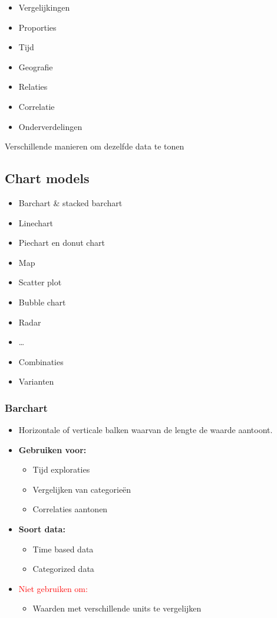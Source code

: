 \documentclass{article}
\newcommand{\bold}[1]{\textbf{#1}}
\begin{document}
\begin{itemize}
    \item Vergelijkingen
    \item Proporties
    \item Tijd
    \item Geografie
    \item Relaties
    \item Correlatie
    \item Onderverdelingen
\end{itemize}

Verschillende manieren om dezelfde data te tonen

\subsection{Chart models}

\begin{itemize}
    \item Barchart \& stacked barchart
    \item Linechart
    \item Piechart en donut chart
    \item Map
    \item Scatter plot
    \item Bubble chart
    \item Radar
    \item \dots
    \item Combinaties
    \item Varianten
\end{itemize}

\subsubsection{Barchart}

\begin{itemize}
    \item Horizontale of verticale balken waarvan de lengte de waarde aantoont.
    \item \bold{Gebruiken voor:}
    \begin{itemize}
        \item Tijd exploraties
        \item Vergelijken van categorieën
        \item Correlaties aantonen
    \end{itemize}
    \item \bold{Soort data:}
    \begin{itemize}
        \item Time based data
        \item Categorized data
    \end{itemize}
    \item \textcolor{red}{Niet gebruiken om:}
    \begin{itemize}
        \item Waarden met verschillende units te vergelijken
    \end{itemize}
\end{itemize}
\end{document}
